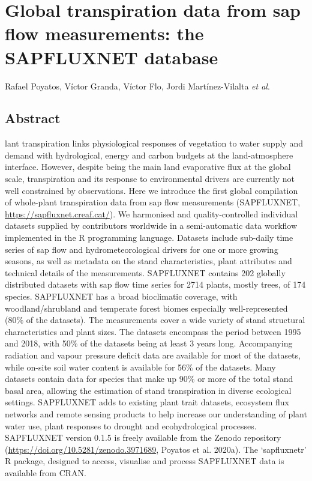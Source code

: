 \documentclass[11pt,twoside]{reedthesis}
\begin{document}
\chapter[The SAPFLUXNET database]{Global transpiration data from sap flow measurements: the SAPFLUXNET database}

\setlength{\parskip}{0.2cm plus4mm minus3mm} \setlength{\parindent}{0pt}
Rafael Poyatos, Víctor Granda, Víctor Flo, Jordi Martínez-Vilalta
\emph{et al}. \newpage
\setlength{\parindent}{30pt}

\section*{Abstract}

lant transpiration links physiological responses of vegetation to water
supply and demand with hydrological, energy and carbon budgets at the
land-atmosphere interface. However, despite being the main land
evaporative flux at the global scale, transpiration and its response to
environmental drivers are currently not well constrained by
observations. Here we introduce the first global compilation of
whole-plant transpiration data from sap flow measurements (SAPFLUXNET,
\url{https://sapfluxnet.creaf.cat/}). We harmonised and
quality-controlled individual datasets supplied by contributors
worldwide in a semi-automatic data workflow implemented in the R
programming language. Datasets include sub-daily time series of sap flow
and hydrometeorological drivers for one or more growing seasons, as well
as metadata on the stand characteristics, plant attributes and technical
details of the measurements. SAPFLUXNET contains 202 globally
distributed datasets with sap flow time series for 2714 plants, mostly
trees, of 174 species. SAPFLUXNET has a broad bioclimatic coverage, with
woodland/shrubland and temperate forest biomes especially
well-represented (80\% of the datasets). The measurements cover a wide
variety of stand structural characteristics and plant sizes. The
datasets encompass the period between 1995 and 2018, with 50\% of the
datasets being at least 3 years long. Accompanying radiation and vapour
pressure deficit data are available for most of the datasets, while
on-site soil water content is available for 56\% of the datasets. Many
datasets contain data for species that make up 90\% or more of the total
stand basal area, allowing the estimation of stand transpiration in
diverse ecological settings. SAPFLUXNET adds to existing plant trait
datasets, ecosystem flux networks and remote sensing products to help
increase our understanding of plant water use, plant responses to
drought and ecohydrological processes. SAPFLUXNET version 0.1.5 is
freely available from the Zenodo repository
(\url{https://doi.org/10.5281/zenodo.3971689}, Poyatos et al. 2020a).
The `sapfluxnetr' R package, designed to access, visualise and process
SAPFLUXNET data is available from CRAN.\par
\end{document}
